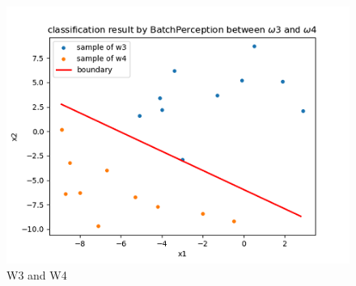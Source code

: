 \documentclass[homework]{IEEEtran}
\begin{document}
\begin{figure}[htb]
    \centerline{\includegraphics{Images/BP34.png}}
    \caption{W3 and W4}
    \label{fig}
\end{figure}\par
\end{document}
